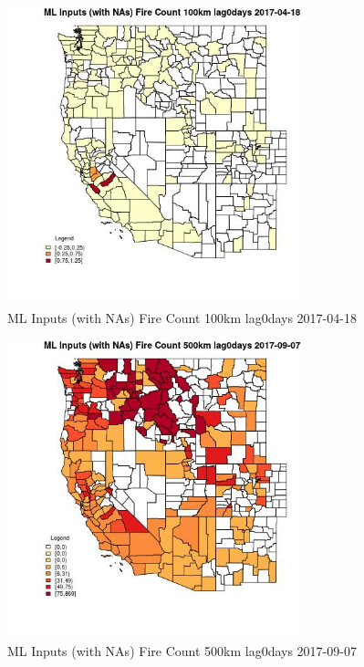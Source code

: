 \begin{figure} 
\centering  
\includegraphics[width=0.77\textwidth]{Code_Outputs/Report_ML_input_PM25_Step4_part_e_de_duplicated_aves_compiled_2019-05-21wNAs_CountyFire_Count_100km_lag0daysMean2017-04-18.jpg} 
\caption{\label{fig:Report_ML_input_PM25_Step4_part_e_de_duplicated_aves_compiled_2019-05-21wNAsCountyFire_Count_100km_lag0daysMean2017-04-18}ML Inputs (with NAs) Fire Count 100km lag0days 2017-04-18} 
\end{figure} 
 

\begin{figure} 
\centering  
\includegraphics[width=0.77\textwidth]{Code_Outputs/Report_ML_input_PM25_Step4_part_e_de_duplicated_aves_compiled_2019-05-21wNAs_CountyFire_Count_500km_lag0daysMean2017-09-07.jpg} 
\caption{\label{fig:Report_ML_input_PM25_Step4_part_e_de_duplicated_aves_compiled_2019-05-21wNAsCountyFire_Count_500km_lag0daysMean2017-09-07}ML Inputs (with NAs) Fire Count 500km lag0days 2017-09-07} 
\end{figure} 
 

